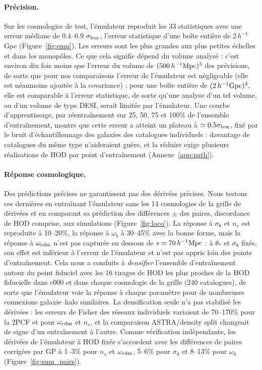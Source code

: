 \paragraph{Précision.} Sur les cosmologies de test, l'émulateur reproduit les 33 statistiques avec une erreur médiane de 0.4--0.9 $\sigma_{\rm box}$, l'erreur statistique d'une boîte entière de $2\,h^{-1}$Gpc (Figure~\ref{fig:emu}). Les erreurs sont les plus grandes aux plus petites échelles et dans les monopôles. Ce que cela signifie dépend du volume analysé : c'est environ dix fois moins que l'erreur du volume de $(500\,h^{-1}\mathrm{Mpc})^3$ des prévisions, de sorte que pour nos comparaisons l'erreur de l'émulateur est négligeable (elle est néanmoins ajoutée à la covariance) ; pour une boîte entière de $(2\,h^{-1}{\rm Gpc})^3$, elle est comparable à l'erreur statistique, de sorte qu'une analyse d'un tel volume, ou d'un volume de type DESI, serait limitée par l'émulateur. Une courbe d'apprentissage, par réentraînement sur 25, 50, 75 et 100\% de l'ensemble d'entraînement, montre que cette erreur a atteint un plateau à $\simeq0.5\sigma_{\rm box}$, fixé par le bruit d'échantillonnage des galaxies des catalogues individuels : davantage de catalogues du même type n'aideraient guère, et la réduire exige plusieurs réalisations de HOD par point d'entraînement (Annexe~\ref{app:path}).

\paragraph{Réponse cosmologique.} Des prédictions précises ne garantissent pas des dérivées précises. Nous testons ces dernières en entraînant l'émulateur sans les 14 cosmologies de la grille de dérivées et en comparant sa prédiction des différences $\pm$ des paires, discordance de HOD comprise, aux simulations (Figure~\ref{fig:loco}). La réponse à $\sigma_8$ et $n_s$ est reproduite à 10--20\%, la réponse à $\omega_b$ à 30--45\% avec la bonne forme, mais la réponse à $\omega_{\rm cdm}$ n'est pas capturée en dessous de $s\simeq70\,h^{-1}\mathrm{Mpc}$ : à $\theta_*$ et $\sigma_8$ fixés, son effet est inférieur à l'erreur de l'émulateur et n'est pas appris loin des points d'entraînement. Cela nous a conduits à \emph{densifier} l'ensemble d'entraînement autour du point fiduciel avec les 16 tirages de HOD les plus proches de la HOD fiducielle dans c000 et dans chaque cosmologie de la grille (240 catalogues), de sorte que l'émulateur voie la réponse à chaque paramètre pour de nombreuses connexions galaxie--halo similaires. La densification seule n'a pas stabilisé les dérivées : les erreurs de Fisher des réseaux individuels variaient de 70--170\% pour la 2PCF et pour $\omega_{\rm cdm}$ et $n_s$, et la comparaison ASTRA/density split changeait de signe d'un entraînement à l'autre. Comme vérification indépendante, les dérivées de l'émulateur à HOD fixée s'accordent avec les différences de paires corrigées par GP à 1--3\% pour $n_s$ et $\omega_{\rm cdm}$, 5--6\% pour $\sigma_8$ et 8--13\% pour $\omega_b$ (Figure~\ref{fig:emu_pairs}).

